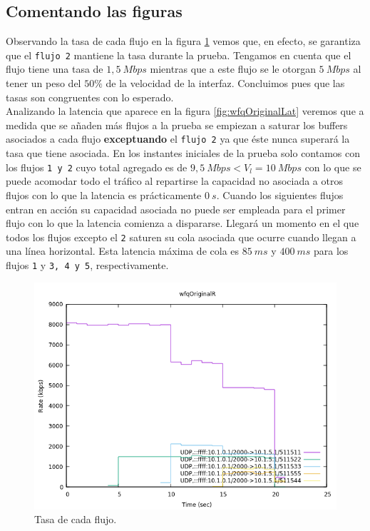 \documentclass[11pt]{article}
\begin{document}
        \subsection{Comentando las figuras}
            Observando la tasa de cada flujo en la figura \ref{fig:wfqOriginalR} vemos que, en efecto, se garantiza que el \texttt{flujo 2} mantiene la tasa durante la prueba. Tengamos en cuenta que el flujo tiene una tasa de $1,5\ Mbps$ mientras que a este flujo se le otorgan $5\ Mbps$ al tener un peso del $50\%$ de la velocidad de la interfaz. Concluimos pues que las tasas son congruentes con lo esperado.\\

            Analizando la latencia que aparece en la figura \ref{fig:wfqOriginalLat} veremos que a medida que se añaden más flujos a la prueba se empiezan a saturar los buffers asociados a cada flujo \textbf{exceptuando} el \texttt{flujo 2} ya que éste nunca superará la tasa que tiene asociada. En los instantes iniciales de la prueba solo contamos con los flujos \texttt{1 y 2} cuyo total agregado es de $9,5\ Mbps < V_l = 10\ Mbps$ con lo que se puede acomodar todo el tráfico al repartirse la capacidad no asociada a otros flujos con lo que la latencia es prácticamente $0\ s$. Cuando los siguientes flujos entran en acción su capacidad asociada no puede ser empleada para el primer flujo con lo que la latencia comienza a dispararse. Llegará un momento en el que todos los flujos excepto el \texttt{2} saturen su cola asociada que ocurre cuando llegan a una línea horizontal. Esta latencia máxima de cola es $85\ ms$ y $400\ ms$ para los flujos \texttt{1} y \texttt{3, 4 y 5}, respectivamente.

            \begin{figure}
                \centering
                \includegraphics[width=0.6\linewidth]{wfqOriginalR.png}
                \caption{Tasa de cada flujo.}
                \label{fig:wfqOriginalR}
            \end{figure}
\end{document}
